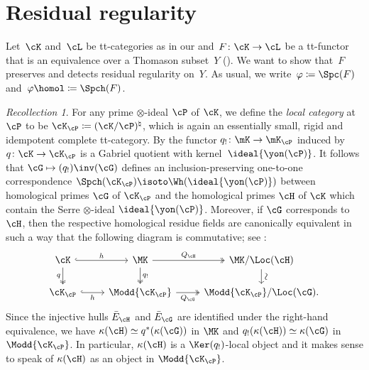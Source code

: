\documentclass[11pt]{amsart}
\numberwithin{equation}{section} %
\theoremstyle{plain}
\theoremstyle{definition}
\theoremstyle{remark}
\newtheorem{rec}[equation]{Recollection}
\begin{document}
\section{Residual regularity}
\label{sec:regularity}%

Let~$\cK$ and~$\cL$ be tt-categories as in our  and~$F\colon \cK\to \cL$ be a tt-functor that is an equivalence over a Thomason subset~$Y$ (). We want to show that~$F$ preserves and detects residual regularity on~$Y$. As usual, we write~$\varphi\coloneq\Spc(F)$ and~$\varphi\homol\coloneq\Spch(F)$.

%
\begin{rec}
\label{rec:stalkcats}
For any prime $\otimes$-ideal $\cP$ of $\cK$, we define the \emph{local category} at~$\cP$ to be $\cK_{\cP} \coloneq (\cK/\cP)^{\natural}$, which is again an essentially small, rigid and idempotent complete tt-category. By \cite[Proposition 2.9]{Balmer20a} the functor $q_! \colon \mK \to \mK_{\cP}$ induced by $q \colon \cK \to \cK_{\cP}$ is a Gabriel quotient with kernel~$\ideal{ \yon(\cP)}$. It follows that $\cG \mapsto (q_!)\inv(\cG)$ defines an inclusion-preserving one-to-one correspondence $\Spch(\cK_\cP)\isoto \Wh(\ideal{\yon(\cP)})$ between homological primes $\cG$ of $\cK_{\cP}$ and the homological primes $\cH$ of $\cK$ which contain the Serre $\otimes$-ideal $\ideal{ \yon(\cP) }$. Moreover, if $\cG$ corresponds to $\cH$, then the respective homological residue fields are canonically equivalent in such a way that the following diagram is commutative; see \cite[Corollary 3.6]{Balmer20a}: 
\[\begin{tikzcd}[row sep=1.5em]
	\cK & \MK & {\MK/\Loc(\cH)} \\
	{\cK_{\cP}} & {\Modd{\cK_{\cP}}} & {\Modd{\cK_{\cP}}/\Loc(\cG)}.
	\arrow["h", hook, from=1-1, to=1-2]
	\arrow["q"', two heads, from=1-1, to=2-1]
	\arrow["{Q_{\cH}}", two heads, from=1-2, to=1-3]
	\arrow["{q_!}", two heads, from=1-2, to=2-2]
	\arrow[from=1-3, to=2-3]
	\arrow["\sim"{marking, allow upside down}, shift left=2, draw=none, from=1-3, to=2-3]
	\arrow["h"', hook, from=2-1, to=2-2]
	\arrow["{Q_{\cG}}"', two heads, from=2-2, to=2-3]
\end{tikzcd}\]
Since the injective hulls $\bar{E}_{\cH}$ and $\bar{E}_{\cG}$ are identified under the right-hand equivalence, we have $\kappa(\cH)\simeq q^*(\kappa(\cG))$ in $\MK$ and $q_! (\kappa(\cH)) \simeq \kappa(\cG)$ in $\Modd{\cK_{\cP}}$. In particular, $\kappa(\cH)$ is a $\Ker(q_!)$-local object and it makes sense to speak of $\kappa(\cH)$ as an object in $\Modd{\cK_{\cP}}$. 
\end{rec}
\end{document}
